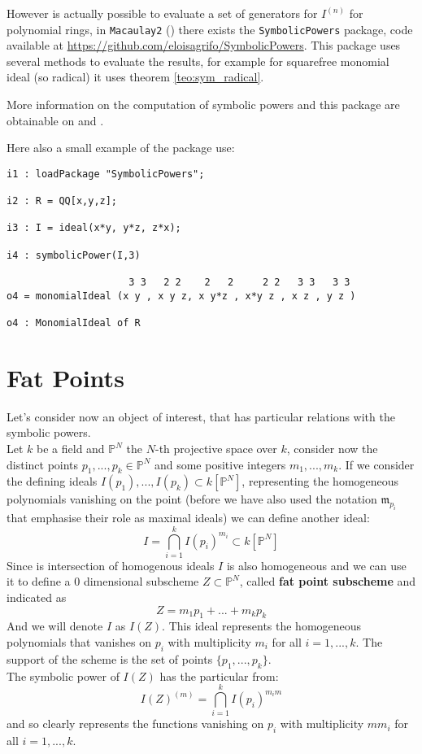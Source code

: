 \documentclass[notitlepage, a4]{book}
\theoremstyle{plain}
\theoremstyle{remark}
\theoremstyle{definition}
\newcommand{\PP}{\mathbb{P}}
\newcommand{\mm}{\mathfrak{m}}
\begin{document}
However is actually possible to evaluate a set of generators for $ I^{(n)} $ for polynomial rings, in \verb|Macaulay2| (\cite{M2}) there exists the \verb|SymbolicPowers| package, code available at  \href{https://github.com/eloisagrifo/SymbolicPowers}{https://github.com/eloisagrifo/SymbolicPowers}. This package uses several methods to evaluate the results, for example for squarefree monomial ideal (so radical) it uses theorem \ref{teo:sym_radical}. 

More information on the computation of symbolic powers and this package are obtainable on \cite{Grifo18Symb} and \cite{Grifo17computation}. 


Here also a small example of the package use:

\begin{lstlisting}[language = Macaulay2]
i1 : loadPackage "SymbolicPowers"; 

i2 : R = QQ[x,y,z];

i3 : I = ideal(x*y, y*z, z*x);

i4 : symbolicPower(I,3)

                     3 3   2 2    2   2     2 2   3 3   3 3
o4 = monomialIdeal (x y , x y z, x y*z , x*y z , x z , y z )

o4 : MonomialIdeal of R

\end{lstlisting}


\section{Fat Points}

Let's consider now an object of interest, that has particular relations with the symbolic powers.\\
Let $ k $ be a field and $ \PP^N$ the $ N $-th projective space over $ k $, consider now the distinct points \linebreak
$ p_1, ... ,p_k \in  \PP^N$ and some positive integers $ m_1 , ... ,m_k $. If we consider the defining ideals $ I(p_1), ... , I(p_k)  \subset k [\PP^N]$, representing the homogeneous polynomials vanishing on the point (before we have also used the notation $ \mm_{p_i}$ that emphasise their role as maximal ideals) we can define another ideal:
\begin{equation}\label{eq:fat_pt}
	I = \bigcap_{i=1}^k I(p_i)^{m_i} \subset k [\PP^N]
\end{equation}
Since is intersection of homogenous ideals $ I $ is also homogeneous and we can use it to define a $ 0 $ dimensional subscheme $ Z \subset \PP^N $, called \textbf{fat point subscheme} and indicated as 
\[
Z = m_1 p_1 + ... +  m_k p_k
\]
And we will denote $ I $ as $ I(Z) $. This ideal represents the homogeneous polynomials that vanishes on $ p_i $ with multiplicity $ m_i $ for all $ i = 1, ... , k $. The support of the scheme is the set of points $ \{ p_1 , ... , p_k\} $.\\
The symbolic power of $ I(Z) $ has the particular from:
\[
I(Z)^{(m)} = \bigcap_{i=1}^k I(p_i)^{m_im}
\]
and so clearly represents the functions vanishing on $ p_i $ with multiplicity $ mm_i $ for all $ i = 1, ... , k $. 
\end{document}

